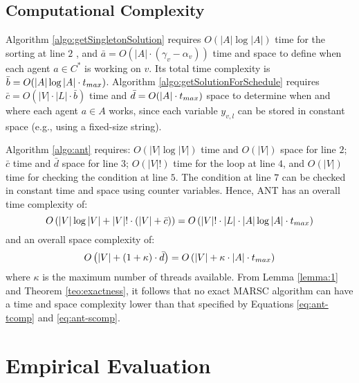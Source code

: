 \subsection{Computational Complexity}

Algorithm \ref{algo:getSingletonSolution} requires $O(|A| \log |A|)$ time for the sorting
at line $2$ \cite{cormen2009}, and $\bar{a} = O(|A| \cdot (\gamma_v - \alpha_v))$ time and
space to define when each agent $a \in C^\ast$ is working on $v$. Its total time
complexity is $\bar{b} = O(|A| \log |A| \cdot t_{max})$. Algorithm
\ref{algo:getSolutionForSchedule} requires $\bar{c} = O(|V| \cdot |L| \cdot \bar{b})$ time
and $\bar{d} = O(|A| \cdot t_{max})$ space to determine when and where each agent $a \in A$
works, since each variable $y_{v, l}$ can be stored in constant space (e.g., using a
fixed-size string).

Algorithm \ref{algo:ant} requires: $O(|V| \log |V|)$ time and $O(|V|)$ space for line $2$;
$\bar{c}$ time and $\bar{d}$ space for line $3$; $O(|V|!)$ time for the loop at line
$4$, and $O(|V|)$ time for checking the condition at line $5$. The condition at line $7$
can be checked in constant time and space using counter variables. Hence, ANT has an
overall time complexity of:
\begin{equation}\label{eq:ant-tcomp}
    O \left( |V| \log |V| + |V|! \cdot \left( |V| + \bar{c} \right) \right)
    =
    O \left( |V|! \cdot |L| \cdot |A| \log |A| \cdot t_{max} \right)
\end{equation}
and an overall space complexity of:
\begin{equation}\label{eq:ant-scomp}
    O \left( |V| + (1 + \kappa) \cdot \bar{d} \right) =
    O \left( |V| + \kappa \cdot |A| \cdot t_{max} \right)
\end{equation}
where $\kappa$ is the maximum number of threads available. From Lemma \ref{lemma:1} and
Theorem \ref{teo:exactness}, it follows that no exact MARSC algorithm can have a time and
space complexity lower than that specified by Equations \ref{eq:ant-tcomp} and
\ref{eq:ant-scomp}.

\section{Empirical Evaluation}\label{sec:marsc-tests}

